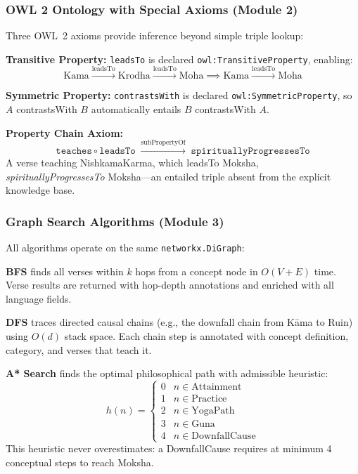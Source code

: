 \documentclass[conference]{IEEEtran}
\begin{document}
\subsubsection{OWL 2 Ontology with Special Axioms (Module 2)}

Three OWL~2 axioms provide inference beyond simple triple lookup:

\textbf{Transitive Property:} \texttt{leadsTo} is declared
\texttt{owl:TransitiveProperty}, enabling:
\[
  \text{Kama} \xrightarrow{\text{leadsTo}} \text{Krodha}
  \xrightarrow{\text{leadsTo}} \text{Moha}
  \implies \text{Kama} \xrightarrow{\text{leadsTo}} \text{Moha}
\]

\textbf{Symmetric Property:} \texttt{contrastsWith} is declared
\texttt{owl:SymmetricProperty}, so $A$ contrastsWith $B$ automatically
entails $B$ contrastsWith $A$.

\textbf{Property Chain Axiom:}
\begin{equation}
  \texttt{teaches} \circ \texttt{leadsTo}
  \;\xrightarrow{\text{subPropertyOf}}\;
  \texttt{spirituallyProgressesTo}
  \label{eq:chain}
\end{equation}
A verse teaching NishkamaKarma, which leadsTo Moksha,
\textit{spirituallyProgressesTo} Moksha—an entailed triple absent from
the explicit knowledge base.

\subsubsection{Graph Search Algorithms (Module 3)}

All algorithms operate on the same \texttt{networkx.DiGraph}:

\textbf{BFS} finds all verses within $k$ hops from a concept node in
$O(V+E)$ time. Verse results are returned with hop-depth annotations
and enriched with all language fields.

\textbf{DFS} traces directed causal chains (e.g., the downfall chain
from K\={a}ma to Ruin) using $O(d)$ stack space. Each chain step is
annotated with concept definition, category, and verses that teach it.

\textbf{A* Search} finds the optimal philosophical path with admissible
heuristic:
\begin{equation}
  h(n) = \begin{cases}
    0 & n \in \text{Attainment} \\
    1 & n \in \text{Practice} \\
    2 & n \in \text{YogaPath} \\
    3 & n \in \text{Guna} \\
    4 & n \in \text{DownfallCause}
  \end{cases}
  \label{eq:heuristic}
\end{equation}
This heuristic never overestimates: a DownfallCause requires at minimum
4 conceptual steps to reach Moksha.
\end{document}
